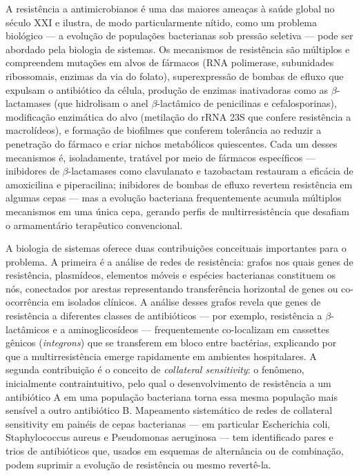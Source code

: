 A resistência a antimicrobianos é uma das maiores ameaças à saúde global no século XXI e ilustra, de modo particularmente nítido, como um problema biológico --- a evolução de populações bacterianas sob pressão seletiva --- pode ser abordado pela biologia de sistemas. Os mecanismos de resistência são múltiplos e compreendem mutações em alvos de fármacos (RNA polimerase, subunidades ribossomais, enzimas da via do folato), superexpressão de bombas de efluxo que expulsam o antibiótico da célula, produção de enzimas inativadoras como as $\beta$-lactamases (que hidrolisam o anel $\beta$-lactâmico de penicilinas e cefalosporinas), modificação enzimática do alvo (metilação do rRNA 23S que confere resistência a macrolídeos), e formação de biofilmes que conferem tolerância ao reduzir a penetração do fármaco e criar nichos metabólicos quiescentes. Cada um desses mecanismos é, isoladamente, tratável por meio de fármacos específicos --- inibidores de $\beta$-lactamases como clavulanato e tazobactam restauram a eficácia de amoxicilina e piperacilina; inibidores de bombas de efluxo revertem resistência em algumas cepas --- mas a evolução bacteriana frequentemente acumula múltiplos mecanismos em uma única cepa, gerando perfis de multirresistência que desafiam o armamentário terapêutico convencional.

A biologia de sistemas oferece duas contribuições conceituais importantes para o problema. A primeira é a análise de redes de resistência: grafos nos quais genes de resistência, plasmídeos, elementos móveis e espécies bacterianas constituem os nós, conectados por arestas representando transferência horizontal de genes ou co-ocorrência em isolados clínicos. A análise desses grafos revela que genes de resistência a diferentes classes de antibióticos --- por exemplo, resistência a $\beta$-lactâmicos e a aminoglicosídeos --- frequentemente co-localizam em cassettes gênicos (\emph{integrons}) que se transferem em bloco entre bactérias, explicando por que a multirresistência emerge rapidamente em ambientes hospitalares. A segunda contribuição é o conceito de \emph{collateral sensitivity}: o fenômeno, inicialmente contraintuitivo, pelo qual o desenvolvimento de resistência a um antibiótico A em uma população bacteriana torna essa mesma população mais sensível a outro antibiótico B. Mapeamento sistemático de redes de collateral sensitivity em painéis de cepas bacterianas --- em particular Escherichia coli, Staphylococcus aureus e Pseudomonas aeruginosa --- tem identificado pares e trios de antibióticos que, usados em esquemas de alternância ou de combinação, podem suprimir a evolução de resistência ou mesmo revertê-la.

